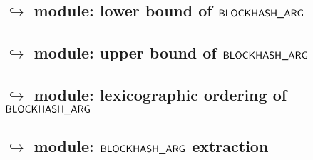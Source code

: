 \subsection{\blockHashMod{} $\hookrightarrow$ \wcpMod{} module: lower bound of $\textsf{BLOCKHASH\_ARG}$}               \label{block hash: lookups: wcp: lower bound}                     
\subsection{\blockHashMod{} $\hookrightarrow$ \wcpMod{} module: upper bound of $\textsf{BLOCKHASH\_ARG}$}               \label{block hash: lookups: wcp: upper bound}                     
\subsection{\blockHashMod{} $\hookrightarrow$ \wcpMod{} module: lexicographic ordering of $\textsf{BLOCKHASH\_ARG}$}    \label{block hash: lookups: wcp: lexicographic ordering}          
\subsection{\blockHashMod{} $\hookrightarrow$ \btcMod{} module: $\textsf{BLOCKHASH\_ARG}$ extraction}                   \label{block hash: lookups: block data: (block)number extraction} 
